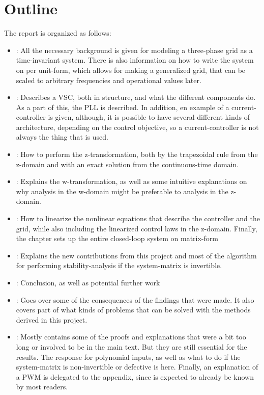 \section{Outline}
The report is organized as follows: 
\begin{itemize}
 \item {}: All the necessary background is given for modeling a three-phase grid as a time-invariant system. There is also information on how to write the system on per unit-form, which allows for making a generalized grid, that can be scaled to arbitrary frequencies and operational values later. 
 \item {}: Describes a \gls{VSC}, both in structure, and what the different components do. As a part of this, the \gls{PLL} is described. In addition, en example of a current-controller is given, although, it is possible to have several different kinds of architecture, depending on the control objective, so a current-controller is not always the thing that is used. 
 \item {}: How to perform the z-transformation, both by the trapezoidal rule from the z-domain and with an exact solution from the continuous-time domain. 
 \item {}: Explains the w-transformation, as well as some intuitive explanations on why analysis in the w-domain might be preferable to analysis in the z-domain. 
 \item {}: How to linearize the nonlinear equations that describe the controller and the grid, while also including the linearized control laws in the z-domain. Finally, the chapter sets up the entire closed-loop system on matrix-form 
 \item {}: Explains the new contributions from this project and most of the algorithm for performing stability-analysis if the system-matrix is invertible. 
 \item {}: Conclusion, as well as potential further work
 \item {}: Goes over some of the consequences of the findings that were made. It also covers part of what kinds of problems that can be solved with the methods derived in this project. 
 \item {}: Mostly contains some of the proofs and explanations that were a bit too long or involved to be in the main text. But they are still essential for the results. The response for polynomial inputs, as well as what to do if the system-matrix is non-invertible or defective is here. Finally, an explanation of a PWM is delegated to the appendix, since is expected to already be known by most readers. 
 
\end{itemize}

